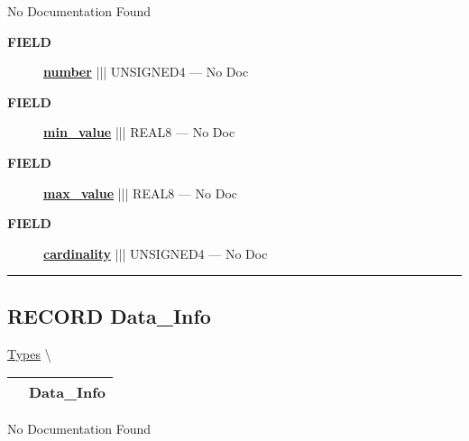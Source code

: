 No Documentation Found







\par
\begin{description}
\item [\colorbox{tagtype}{\color{white} \textbf{\textsf{FIELD}}}] \textbf{\underline{number}} ||| UNSIGNED4 --- No Doc
\item [\colorbox{tagtype}{\color{white} \textbf{\textsf{FIELD}}}] \textbf{\underline{min\_value}} ||| REAL8 --- No Doc
\item [\colorbox{tagtype}{\color{white} \textbf{\textsf{FIELD}}}] \textbf{\underline{max\_value}} ||| REAL8 --- No Doc
\item [\colorbox{tagtype}{\color{white} \textbf{\textsf{FIELD}}}] \textbf{\underline{cardinality}} ||| UNSIGNED4 --- No Doc
\end{description}





\rule{\linewidth}{0.5pt}
\subsection*{\textsf{\colorbox{headtoc}{\color{white} RECORD}
Data\_Info}}

\hypertarget{ecldoc:logisticregression.types.data_info}{}
\hspace{0pt} \hyperlink{ecldoc:LogisticRegression.Types}{Types} \textbackslash 

{\renewcommand{\arraystretch}{1.5}
\begin{tabularx}{\textwidth}{|>{\raggedright\arraybackslash}l|X|}
\hline
\hspace{0pt}\mytexttt{\color{red} } & \textbf{Data\_Info} \\
\hline
\end{tabularx}
}

\par





No Documentation Found








